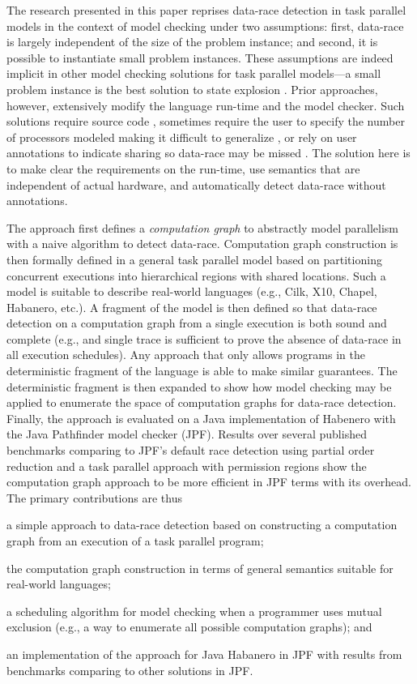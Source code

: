 The research presented in this paper reprises data-race detection in task parallel models in the context of model checking under two assumptions: first, data-race is largely independent of the size of the problem instance; and second, it is possible to instantiate small problem instances. These assumptions are indeed implicit in other model checking solutions for task parallel models---a small problem instance is the best solution to state explosion \cite{gligoric2012x10x,zirkel2013automated,anderson2014jpf}. Prior approaches, however, extensively modify the language run-time and the model checker. Such solutions require source code \cite{gligoric2012x10x}, sometimes require the user to specify the number of processors modeled making it difficult to generalize \cite{zirkel2013automated}, or rely on user annotations to indicate sharing so data-race may be missed \cite{anderson2014jpf}. The solution here is to make clear the requirements on the run-time, use semantics that are independent of actual hardware, and automatically detect data-race without annotations. 

The approach first defines a \emph{computation graph} to abstractly model parallelism with a naive algorithm to detect data-race. Computation graph construction is then formally defined in a general task parallel model based on partitioning concurrent executions into hierarchical regions with shared locations. Such a model is suitable to describe real-world languages (e.g., Cilk, X10, Chapel, Habanero, etc.).  A fragment of the model is then defined so that data-race detection on a computation graph from a single execution is both sound and complete (e.g., and single trace is sufficient to prove the absence of data-race in all execution schedules). Any approach that only allows programs in the deterministic fragment of the language is able to make similar guarantees. The deterministic fragment is then expanded to show how model checking may be applied to enumerate the space of computation graphs for data-race detection. Finally, the approach is evaluated on a Java implementation of Habenero with the Java Pathfinder model checker (JPF). Results over several published benchmarks comparing to JPF's default race detection using partial order reduction and a task parallel approach with permission regions show the computation graph approach to be more efficient in JPF terms with its overhead. The primary contributions are thus
\begin{compactitem}
\item a simple approach to data-race detection based on constructing a computation graph from an execution of a task parallel program;
\item the computation graph construction in terms of general semantics suitable for real-world languages;
\item a scheduling algorithm for model checking when a programmer uses mutual exclusion (e.g., a way to enumerate all possible computation graphs); and
\item an implementation of the approach for Java Habanero in JPF with results from benchmarks comparing to other solutions in JPF. 
\end{compactitem}
